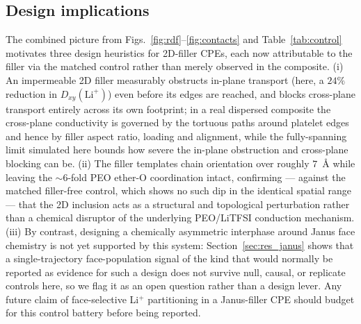 \documentclass[review, 12pt]{elsarticle}
\numberwithin{equation}{section}
\newcommand{\figs}[1] {Figs.~\ref{#1}}
\newcommand{\sect}[1] {Section~\ref{#1}}
\newcommand{\Tab}[1] {Table~\ref{#1}}
\newcommand{\Dxy}{D_{xy}}
\newcommand{\LiTFSI}{LiTFSI\xspace}
\begin{document}
\subsection{Design implications}
The combined picture from \figs{fig:rdf}--\ref{fig:contacts} and \Tab{tab:control} motivates three design heuristics for 2D-filler CPEs, each now attributable to the filler via the matched control rather than merely observed in the composite. (i) An impermeable 2D filler measurably obstructs in-plane transport (here, a $24\%$ reduction in $\Dxy(\mathrm{Li}^+)$) even before its edges are reached, and blocks cross-plane transport entirely across its own footprint; in a real dispersed composite the cross-plane conductivity is governed by the tortuous paths around platelet edges and hence by filler aspect ratio, loading and alignment, while the fully-spanning limit simulated here bounds how severe the in-plane obstruction and cross-plane blocking can be. (ii) The filler templates chain orientation over roughly $7$~\AA{} while leaving the $\sim6$-fold PEO ether-O coordination intact, confirming --- against the matched filler-free control, which shows no such dip in the identical spatial range --- that the 2D inclusion acts as a structural and topological perturbation rather than a chemical disruptor of the underlying PEO/\LiTFSI conduction mechanism. (iii) By contrast, designing a chemically asymmetric interphase around Janus face chemistry is not yet supported by this system: \sect{sec:res_janus} shows that a single-trajectory face-population signal of the kind that would normally be reported as evidence for such a design does not survive null, causal, or replicate controls here, so we flag it as an open question rather than a design lever. Any future claim of face-selective Li$^+$ partitioning in a Janus-filler CPE should budget for this control battery before being reported.
\end{document}
